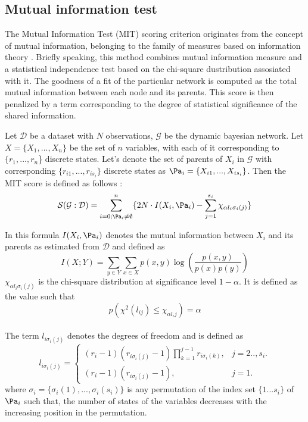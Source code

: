 \subsection{Mutual information test}

The Mutual Information Test (MIT) scoring criterion originates from the concept of mutual information, belonging to the family of measures based on information theory \cite{deCampos}. Briefly speaking, this method combines mutual information measure and a statistical independence test based on the chi-square dustribution assosiated with it. The goodness of a fit of the particular network is computed as the total mutual information between each node and its parents. This score is then penalized by a term corresponding to the degree of statistical significance of the shared information. 

Let $\mathcal{D}$ be a dataset with $N$ observations, $\mathcal{G}$ be the dynamic bayesian network. 
Let $X = \{X_1,...,X_n\}$ be the set of $n$ variables, with each of it corresponding to $ \{r_1,...,r_n$\} discrete states.
Let's denote the set of parents of $X_i$ in $\mathcal{G}$ with corresponding $\{r_{i1},...,r_{is_i}\}$ discrete states
as $\Pa_i = \{X_{i1},...,X_{is_i}\}$. 
Then the MIT score is defined as follows \cite{globMIT}: 
$$\mathcal{S(G:D)} = \sum_{i=0; \Pa_i \neq \emptyset}^n \{ 2N \cdot I(X_i, \Pa_i) - \sum_{j=1}^{s_i} \chi_{\alpha l_i \sigma_i(j)} \}$$

In this formula $I(X_i, \Pa_i)$ denotes the mutual information between $X_i$ and its parents
as estimated from $\mathcal{D}$ and defined as $$ I(X;Y) = \sum_{y \in Y} \sum_{x \in X} p(x,y) \log \left(\frac{p(x,y)}{p(x)p(y)}\right)  $$
$\chi_{\alpha l_i \sigma_i(j)} $ is the chi-square distribution at significance level $1-\alpha$.
It is defined as the value such that $$p(\chi^{2}(l_{ij}) \le \chi_{\alpha l_ij})=\alpha $$
\\The term $ l_{i \sigma_i (j)}$ denotes the degrees of freedom and is defined as 
$$ l_{i \sigma_i (j)} = \begin{cases}
   (r_i-1)(r_{i \sigma_i (j)} -1) \prod_{k=1}^{j-1} r_{i \sigma_i (k)}, & \text{$j=2..,s_i$}.\\
   (r_i-1)(r_{i \sigma_i (j)} -1), & \text{$j=1$}.
 \end{cases}
$$
where $\sigma_i = \{\sigma_i (1),...,\sigma_i(s_i)\}$ is any permutation of the index set
$\{1...s_i\}$ of $\Pa_i$ such that, the number of states of the variables
decreases with the increasing position in the permutation. 

